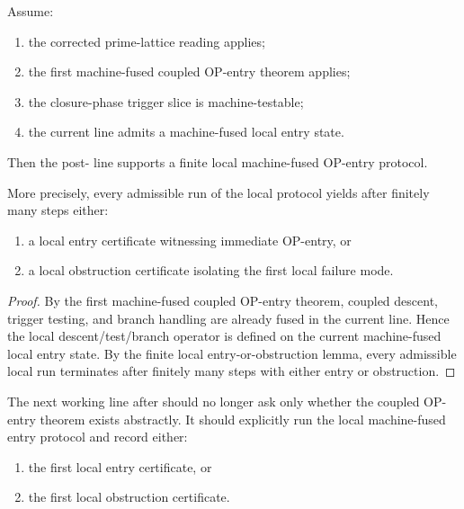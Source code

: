 \begin{theorem}
\label{thm:first-machine-fused-local-op-entry-protocol-theorem}
Assume:
\begin{enumerate}
 \item the corrected prime-lattice reading applies;
 \item the first machine-fused coupled OP-entry theorem applies;
 \item the closure-phase trigger slice is machine-testable;
 \item the current line admits a machine-fused local entry state.
\end{enumerate}
Then the post- line supports a finite local machine-fused OP-entry protocol.

More precisely, every admissible run of the local protocol yields after finitely many steps either:
\begin{enumerate}
 \item a local entry certificate witnessing immediate OP-entry, or
 \item a local obstruction certificate isolating the first local failure mode.
\end{enumerate}
\end{theorem}

\begin{proof}
By the first machine-fused coupled OP-entry theorem, coupled descent, trigger testing, and branch handling are already fused in the current line. Hence the local descent/test/branch operator is defined on the current machine-fused local entry state.
By the finite local entry-or-obstruction lemma, every admissible local run terminates after finitely many steps with either entry or obstruction.
\end{proof}

\begin{corollary}
\label{cor:post-v3320-working-rule}
The next working line after  should no longer ask only whether the coupled OP-entry theorem exists abstractly.
It should explicitly run the local machine-fused entry protocol and record either:
\begin{enumerate}
 \item the first local entry certificate, or
 \item the first local obstruction certificate.
\end{enumerate}
\end{corollary}

